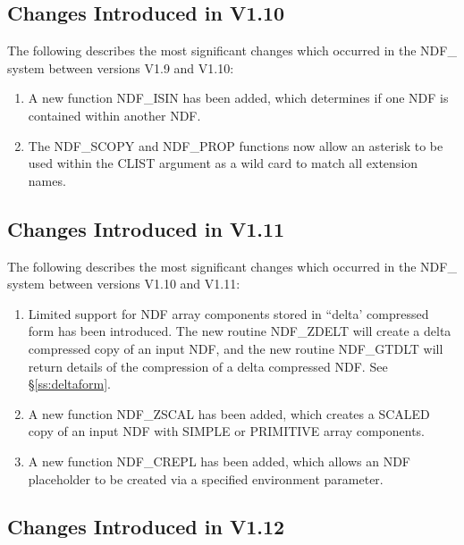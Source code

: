 \documentclass[twoside,11pt,nolof]{starlink}
\begin{document}
\subsection{Changes Introduced in V1.10}

The following describes the most significant changes which occurred in
the NDF\_ system between versions V1.9 and V1.10:

\begin{enumerate}

   \item A new function NDF\_ISIN has been added, which determines if one NDF
   is contained within another NDF.

   \item The NDF\_SCOPY and NDF\_PROP functions now allow an asterisk to be
   used within the CLIST argument as a wild card to match all extension
   names.

\end{enumerate}

\subsection{Changes Introduced in V1.11}

The following describes the most significant changes which occurred in
the NDF\_ system between versions V1.10 and V1.11:

\begin{enumerate}

   \item Limited support for NDF array components stored in ``delta'
   compressed form has been introduced. The new routine NDF\_ZDELT will
   create a delta compressed copy of an input NDF, and the new routine
   NDF\_GTDLT will return details of the compression of a delta
   compressed NDF. See \S\ref{ss:deltaform}.

   \item A new function NDF\_ZSCAL has been added, which creates a SCALED
   copy of an input NDF with SIMPLE or PRIMITIVE array components.

   \item A new function NDF\_CREPL has been added, which allows an NDF
   placeholder to be created via a specified environment parameter.

\end{enumerate}

\subsection{Changes Introduced in V1.12}
\end{document}
